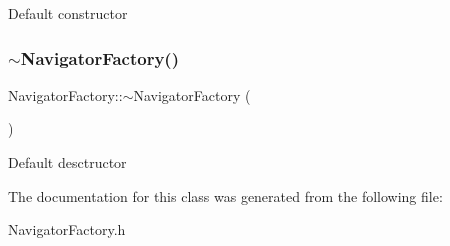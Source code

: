 Default constructor \mbox{\label{classNavigatorFactory_a761b19635335f0d772196005e443ebd3}} 
\subsubsection{\texorpdfstring{$\sim$\+Navigator\+Factory()}{~NavigatorFactory()}}
{\footnotesize\ttfamily Navigator\+Factory\+::$\sim$\+Navigator\+Factory (\begin{DoxyParamCaption}{ }\end{DoxyParamCaption})}

Default desctructor 

The documentation for this class was generated from the following file\+:\begin{DoxyCompactItemize}
\item 
Navigator\+Factory.\+h\end{DoxyCompactItemize}
